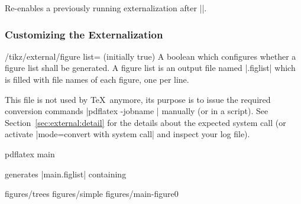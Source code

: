 {\begin{command}{\tikzexternalenable}
    Re-enables a previously running externalization after |\tikzexternaldisable|.
\end{command}


\subsubsection{Customizing the Externalization}

\begin{key}{/tikz/external/figure list= (initially true)}
    A boolean which configures whether a figure list shall be generated. A
    figure list is an output file named |.figlist| which is
    filled with file names of each figure, one per line.

    This file is not used by \TeX\ anymore, its purpose is to issue the
    required conversion commands |pdflatex -jobname |
     manually (or in a script). See
    Section~\ref{sec:external:detail} for the details about the expected system
    call (or activate |mode=convert with system call| and inspect your log
    file).

\begin{codeexample}[code only, tikz syntax=false]
pdflatex main
\end{codeexample}
    generates |main.figlist| containing
\begin{codeexample}[code only, tikz syntax=false]
figures/trees
figures/simple
figures/main-figure0
\end{codeexample}
\end{key}

}
